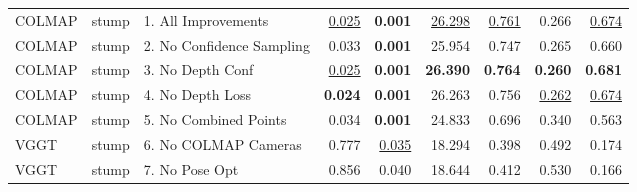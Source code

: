 \begin{table}[H]
\begin{tabular}{lllrrrrrr}
\midrule
COLMAP & stump & 1. All Improvements & \underline{0.025} & \textbf{0.001} & \underline{26.298} & \underline{0.761} & 0.266 & \underline{0.674} \\
COLMAP & stump & 2. No Confidence Sampling & 0.033 & \textbf{0.001} & 25.954 & 0.747 & 0.265 & 0.660 \\
COLMAP & stump & 3. No Depth Conf & \underline{0.025} & \textbf{0.001} & \textbf{26.390} & \textbf{0.764} & \textbf{0.260} & \textbf{0.681} \\
COLMAP & stump & 4. No Depth Loss & \textbf{0.024} & \textbf{0.001} & 26.263 & 0.756 & \underline{0.262} & \underline{0.674} \\
COLMAP & stump & 5. No Combined Points & 0.034 & \textbf{0.001} & 24.833 & 0.696 & 0.340 & 0.563 \\
VGGT & stump & 6. No COLMAP Cameras & 0.777 & \underline{0.035} & 18.294 & 0.398 & 0.492 & 0.174 \\
VGGT & stump & 7. No Pose Opt & 0.856 & 0.040 & 18.644 & 0.412 & 0.530 & 0.166 \\
\bottomrule
\end{tabular}
\end{table}